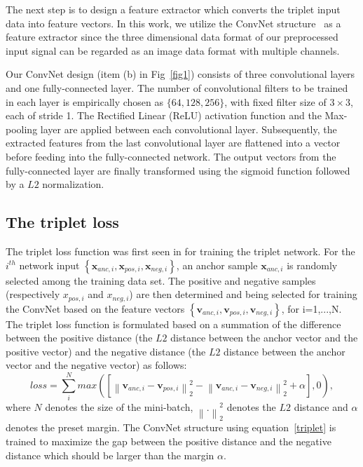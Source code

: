 \documentclass[sigconf]{acmart}
\begin{document}
The next step is to design a feature extractor which converts the  triplet input data into feature vectors. In this work, we utilize the ConvNet structure~\cite{lecun1998gradient} as a feature extractor since the three dimensional data format of our preprocessed input signal can be regarded as an image data format with multiple channels. 

Our ConvNet design (item (b) in Fig~\ref{fig1}) consists of three convolutional layers and one fully-connected layer. The number of convolutional filters to be trained in each layer is empirically chosen as $\{64, 128, 256\}$, with fixed filter size of $3\times3$, each of stride 1. The Rectiﬁed Linear (ReLU) activation function and the Max-pooling layer are applied between each convolutional layer. Subsequently, the extracted features from the last convolutional layer are flattened into a vector before feeding into the fully-connected network.
The output vectors from the fully-connected layer are finally transformed using the sigmoid function followed by a $L2$ normalization.

\subsection{The triplet loss}

The triplet loss function was first seen in \cite{hoffer2015deep} for training the triplet network. For the $i^{th}$ network input $\left\{\mathbf{x}_{anc,i}, \mathbf{x}_{pos,i}, \mathbf{x}_{neg,i}\right\}$, an anchor sample $\mathbf{x}_{anc,i}$ is randomly selected among the training data set. The positive and negative samples (respectively $x_{pos,i}$ and $x_{neg,i}$) are then determined and being selected for training the ConvNet based on the feature vectors $\left\{\mathbf{v}_{anc,i},\mathbf{v}_{pos,i},\mathbf{v}_{neg,i}\right\}$, for i=1,...,N.
The triplet loss function is formulated based on a summation of the difference between the positive distance (the $L2$ distance between the anchor vector and the positive vector) and the negative distance (the $L2$ distance between the anchor vector and the negative vector) as follows:
\begin{equation}
    loss = \sum_i^N max\left({ \left[ {\left\| {{\mathbf{v}_{anc,i}} - {\mathbf{v}_{pos,i}}} \right\|_2^2} - {\left\| {{\mathbf{v}_{anc,i}} - {\mathbf{v}_{neg,i}}} \right\|_2^2}  + \alpha \right]},0 \right),\label{triplet}
\end{equation}
where $N$ denotes the size of the mini-batch, ${\left\| . \right\|_2^2}$ denotes the $L2$ distance and $\alpha$ denotes the preset margin.
The ConvNet structure using equation~\eqref{triplet} is trained to maximize the gap between the positive distance and the negative distance which should be larger than the margin $\alpha$.
\end{document}
